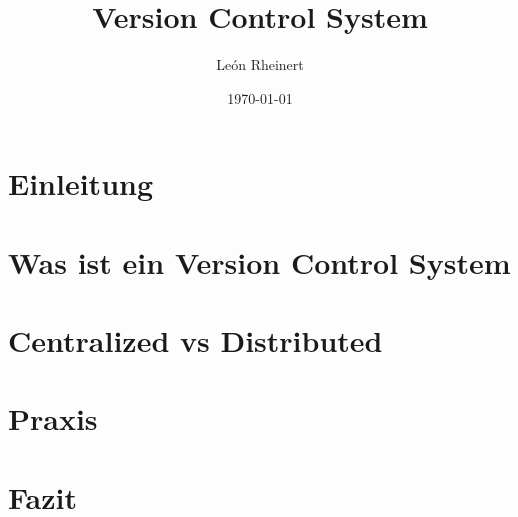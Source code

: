\documentclass[12pt]{article}
\title{Version Control System}
\author{León Rheinert}
\date{\today}
\begin{document}
    
    \newpage

    \tableofcontents
    \newpage

    \section{Einleitung}
        
    
    \section{Was ist ein Version Control System} 
        
    
    \section{Centralized vs Distributed}
        
    
    \section{Praxis}
        
    
    \section{Fazit}
        
    
    \newpage
    \printbibliography
\end{document}
